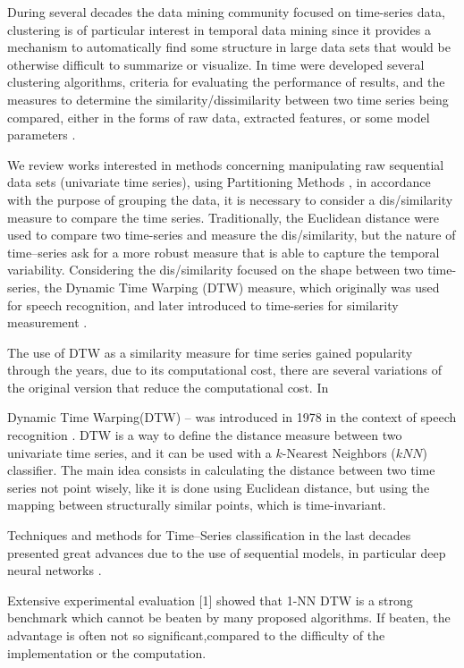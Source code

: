 During several decades the data mining community focused on time-series data, clustering is of particular interest in temporal data mining since it provides a mechanism to automatically find some structure in large data sets that would be otherwise difficult to summarize or visualize. In time were developed several clustering algorithms, criteria for evaluating the performance of results, and the measures to determine the similarity/dissimilarity between two time series being compared, either in the forms of raw data, extracted features, or some model parameters \cite{Liao2005, Aghabozorgi2015}.

We review works interested in methods concerning manipulating raw sequential data sets (univariate time series), using Partitioning Methods \cite{Kaufman2009}, in accordance with the purpose of grouping the data, it is necessary to consider a dis/similarity measure to compare the time series. Traditionally, the Euclidean distance were used to compare two time-series and measure the dis/similarity, but the nature of time--series ask for a more robust measure that is able to capture the temporal variability. Considering the dis/similarity focused on the shape between two time-series, the Dynamic Time Warping (DTW) measure, which originally was used for speech recognition, and later introduced to time-series for similarity measurement \cite{Sakoe1978}.

The use of DTW as a similarity measure for time series gained popularity through the years, due to its computational cost, there are several variations of the original version that reduce the computational cost. In 

Dynamic  Time  Warping(DTW) – was introduced in 1978 in the context of speech recognition \cite{Sakoe1978}. DTW is a way to define the distance measure between two univariate time series, and it can be used with a $k$-Nearest Neighbors ($kNN$) classifier. The main idea consists in calculating the distance between two time series not point wisely, like it is done using Euclidean distance, but using the mapping between structurally similar points, which is time-invariant.

Techniques and methods for Time--Series classification in the last decades presented great advances due to the use of sequential models, in particular deep neural networks \cite{Fawaz2019}. 

Extensive  experimental  evaluation  [1] showed  that  1-NN  DTW  is  a  strong  benchmark  which  cannot  be  beaten  by many proposed algorithms. If beaten, the advantage is often not so significant,compared to the difficulty of the implementation or the computation.

